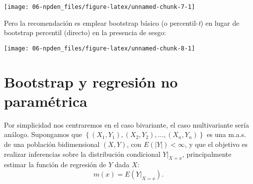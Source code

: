\documentclass[]{book}
\newenvironment{Shaded}{\begin{snugshade}}{\end{snugshade}}
\newcommand{\KeywordTok}[1]{\textcolor[rgb]{0.13,0.29,0.53}{\textbf{#1}}}
\newcommand{\DataTypeTok}[1]{\textcolor[rgb]{0.13,0.29,0.53}{#1}}
\newcommand{\DecValTok}[1]{\textcolor[rgb]{0.00,0.00,0.81}{#1}}
\newcommand{\StringTok}[1]{\textcolor[rgb]{0.31,0.60,0.02}{#1}}
\newcommand{\OperatorTok}[1]{\textcolor[rgb]{0.81,0.36,0.00}{\textbf{#1}}}
\newcommand{\NormalTok}[1]{#1}
\theoremstyle{break}
\theoremstyle{definition}
\theoremstyle{definition}
\theoremstyle{definition}
\theoremstyle{remark}
\begin{document}
\begin{Shaded}
\end{Shaded}

\begin{center}\texttt{[image: 06-npden\_files/figure-latex/unnamed-chunk-7-1]} \end{center}

Pero la recomendación es emplear bootstrap básico (o percentil-\emph{t})
en lugar de bootstrap percentil (directo) en la presencia de sesgo:

\begin{Shaded}
\end{Shaded}

\begin{center}\texttt{[image: 06-npden\_files/figure-latex/unnamed-chunk-8-1]} \end{center}

\chapter{Bootstrap y regresión no paramétrica}\label{npreg}

Por simplicidad nos centraremos en el caso bivariante, el caso
multivariante sería análogo. Supongamos que
\(\left\{ \left( X_1,Y_1 \right),\left( X_2,Y_2 \right), \ldots, \left( X_n,Y_n \right) \right\}\)
es una m.a.s. de una población bidimensional \(\left( X,Y \right)\), con
\(E\left( \left\vert Y\right\vert \right) <\infty\), y que el objetivo
es realizar inferencias sobre la distribución condicional
\(\left. Y \right\vert_{X=x}\), principalmente estimar la función de
regresión de \(Y\) dada \(X\):
\[m\left( x \right) =E\left( \left. Y\right\vert_{X=x} \right).\]
\end{document}
